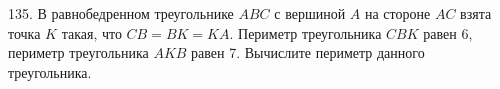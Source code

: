 135. В равнобедренном треугольнике $ABC$ с вершиной $A$ на стороне $AC$ взята точка $K$ такая, что $CB=BK=KA.$ Периметр треугольника $CBK$ равен 6, периметр треугольника $AKB$ равен 7. Вычислите периметр данного треугольника.\\
